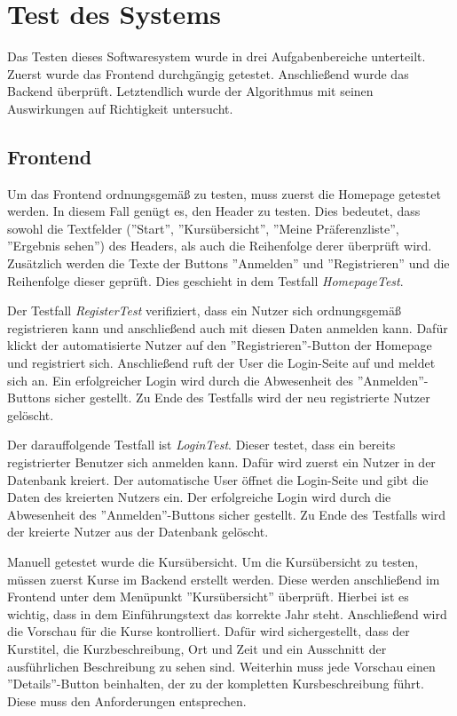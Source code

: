 \chapter{Test des Systems}
\label{chapter:testing}

	Das Testen dieses Softwaresystem wurde in drei Aufgabenbereiche unterteilt.
	Zuerst wurde das Frontend durchgängig getestet.
	Anschließend wurde das Backend überprüft.
	Letztendlich wurde der Algorithmus mit seinen Auswirkungen auf Richtigkeit untersucht.
	
	\section{Frontend}
		Um das Frontend ordnungsgemäß zu testen, muss zuerst die Homepage getestet werden.
		In diesem Fall genügt es, den Header zu testen.
		Dies bedeutet, dass sowohl die Textfelder (''Start'', ''Kursübersicht'', ''Meine Präferenzliste'', ''Ergebnis sehen'') des Headers, als auch die Reihenfolge derer überprüft wird.
		Zusätzlich werden die Texte der Buttons ''Anmelden'' und ''Registrieren'' und die Reihenfolge dieser geprüft.
		Dies geschieht in dem Testfall \textit{HomepageTest}.\newline
		
		Der Testfall \textit{RegisterTest} verifiziert, dass ein Nutzer sich ordnungsgemäß registrieren kann und anschließend auch mit diesen Daten anmelden kann.
		Dafür klickt der automatisierte Nutzer auf den ''Registrieren''-Button der Homepage und registriert sich.
		Anschließend ruft der User die Login-Seite auf und meldet sich an.
		Ein erfolgreicher Login wird durch die Abwesenheit des ''Anmelden''-Buttons sicher gestellt.
		Zu Ende des Testfalls wird der neu registrierte Nutzer gelöscht.\newline
		
		Der darauffolgende Testfall ist \textit{LoginTest}.
		Dieser testet, dass ein bereits registrierter Benutzer sich anmelden kann.
		Dafür wird zuerst ein Nutzer in der Datenbank kreiert.
		Der automatische User öffnet die Login-Seite und gibt die Daten des kreierten Nutzers ein.
		Der erfolgreiche Login wird durch die Abwesenheit des ''Anmelden''-Buttons sicher gestellt.
		Zu Ende des Testfalls wird der kreierte Nutzer aus der Datenbank gelöscht.\newline
		
		Manuell getestet wurde die Kursübersicht.
		Um die Kursübersicht zu testen, müssen zuerst Kurse im Backend erstellt werden.
		Diese werden anschließend im Frontend unter dem Menüpunkt ''Kursübersicht'' überprüft.
		Hierbei ist es wichtig, dass in dem Einführungstext das korrekte Jahr steht.
		Anschließend wird die Vorschau für die Kurse kontrolliert.
		Dafür wird sichergestellt, dass der Kurstitel, die Kurzbeschreibung, Ort und Zeit und ein Ausschnitt der ausführlichen Beschreibung zu sehen sind.
		Weiterhin muss jede Vorschau einen ''Details''-Button beinhalten, der zu der kompletten Kursbeschreibung führt.
		Diese muss den Anforderungen entsprechen.\newline
		
